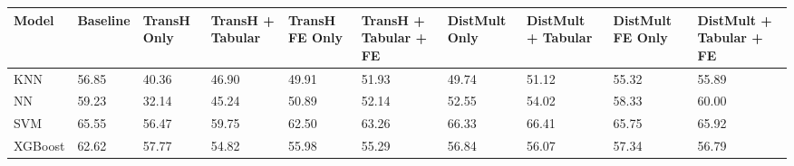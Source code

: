 \begin{tabular}{llllllllll}
\toprule
Model & Baseline & TransH Only & TransH + Tabular & TransH FE Only & TransH + Tabular + FE & DistMult Only & DistMult + Tabular & DistMult FE Only & DistMult + Tabular + FE \\
\midrule
KNN & 56.85 & 40.36 & 46.90 & 49.91 & 51.93 & 49.74 & 51.12 & 55.32 & 55.89 \\
NN & 59.23 & 32.14 & 45.24 & 50.89 & 52.14 & 52.55 & 54.02 & 58.33 & 60.00 \\
SVM & 65.55 & 56.47 & 59.75 & 62.50 & 63.26 & 66.33 & 66.41 & 65.75 & 65.92 \\
XGBoost & 62.62 & 57.77 & 54.82 & 55.98 & 55.29 & 56.84 & 56.07 & 57.34 & 56.79 \\
\bottomrule
\end{tabular}
